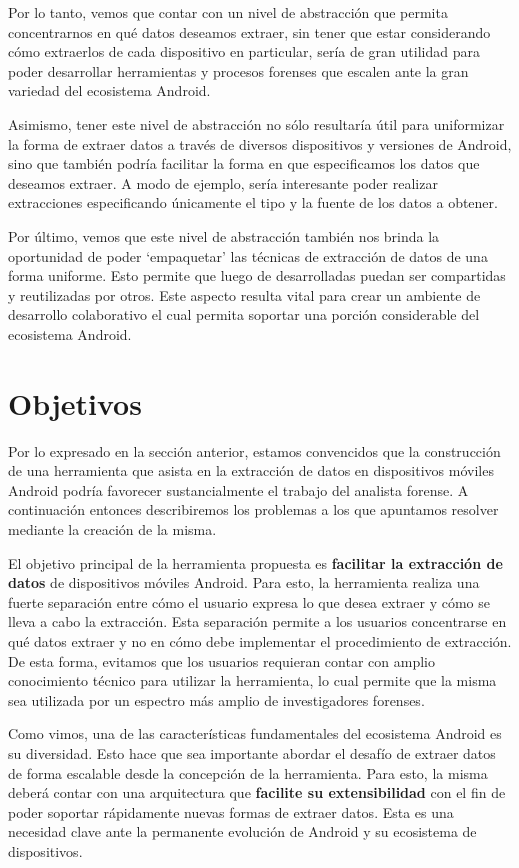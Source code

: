 Por lo tanto, vemos que contar con un nivel de abstracción que permita concentrarnos en qué datos deseamos extraer, sin tener que estar considerando cómo extraerlos de cada dispositivo en particular, sería de gran utilidad para poder desarrollar herramientas y procesos forenses que escalen ante la gran variedad del ecosistema Android.

Asimismo, tener este nivel de abstracción no sólo resultaría útil para uniformizar la forma de extraer datos a través de diversos dispositivos y versiones de Android, sino que también podría facilitar la forma en que especificamos los datos que deseamos extraer. A modo de ejemplo, sería interesante poder realizar extracciones especificando únicamente el tipo y la fuente de los datos a obtener.

Por último, vemos que este nivel de abstracción también nos brinda la oportunidad de poder \enquote*{empaquetar} las técnicas de extracción de datos de una forma uniforme. Esto permite que luego de desarrolladas puedan ser compartidas y reutilizadas por otros. Este aspecto resulta vital para crear un ambiente de desarrollo colaborativo el cual permita soportar una porción considerable del ecosistema Android.

\section{Objetivos}
Por lo expresado en la sección anterior, estamos convencidos que la construcción de una herramienta que asista en la extracción de datos en dispositivos móviles Android podría favorecer sustancialmente el trabajo del analista forense. A continuación entonces describiremos los problemas a los que apuntamos resolver mediante la creación de la misma.

El objetivo principal de la herramienta propuesta es \textbf{facilitar la extracción de datos} de dispositivos móviles Android. Para esto, la herramienta realiza una fuerte separación entre cómo el usuario expresa lo que desea extraer y cómo se lleva a cabo la extracción. Esta separación permite a los usuarios concentrarse en qué datos extraer y no en cómo debe implementar el procedimiento de extracción. De esta forma, evitamos que los usuarios requieran contar con amplio conocimiento técnico para utilizar la herramienta, lo cual permite que la misma sea utilizada por un espectro más amplio de investigadores forenses.

Como vimos, una de las características fundamentales del ecosistema Android es su diversidad. Esto hace que sea importante abordar el desafío de extraer datos de forma escalable desde la concepción de la herramienta. Para esto, la misma deberá contar con una arquitectura que \textbf{facilite su extensibilidad} con el fin de poder soportar rápidamente nuevas formas de extraer datos. Esta es una necesidad clave ante la permanente evolución de Android y su ecosistema de dispositivos.

